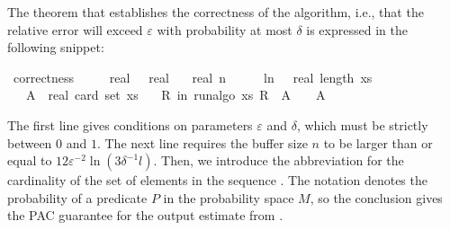
The theorem that establishes the correctness of the algorithm, i.e., that the relative error will exceed $\varepsilon$ with probability at most $\delta$ is expressed in the following snippet:
\begin{isabelle_cm}
\isamarkupfalse%
\ correctness{\isacharcolon}{\kern0pt}\isanewline
\ \ \ {\isacartoucheopen}{\isasymepsilon}\ {\isasymin}\ {\isacharbraceleft}{\kern0pt}{}{\isacharless}{\kern0pt}{\isachardot}{\kern0pt}{\isachardot}{\kern0pt}{\isacharless}{\kern0pt}{}{\isacharcolon}{\kern0pt}{\isacharcolon}{\kern0pt}real{\isacharbraceright}{\kern0pt}{\isacartoucheclose}\ {\isacartoucheopen}{\isasymdelta}\ {\isasymin}\ {\isacharbraceleft}{\kern0pt}{}{\isacharless}{\kern0pt}{\isachardot}{\kern0pt}{\isachardot}{\kern0pt}{\isacharless}{\kern0pt}{}{\isacharcolon}{\kern0pt}{\isacharcolon}{\kern0pt}real{\isacharbraceright}{\kern0pt}{\isacartoucheclose}\isanewline
\ \ \ {\isacartoucheopen}real\ n\ {\isasymge}\ {}{}\ {\isacharslash}{\kern0pt}\ {\isasymepsilon}\ {\isacharasterisk}{\kern0pt}\ ln\ {\isacharparenleft}{\kern0pt}{}\ {\isacharasterisk}{\kern0pt}\ real\ {\isacharparenleft}{\kern0pt}length\ xs{\isacharparenright}{\kern0pt}\ {\isacharslash}{\kern0pt}\ {\isasymdelta}{\isacharparenright}{\kern0pt}{\isacartoucheclose}\isanewline
\ \ \ {\isacartoucheopen}A\ {\isasymequiv}\ real\ {\isacharparenleft}{\kern0pt}card\ {\isacharparenleft}{\kern0pt}set\ xs{\isacharparenright}{\kern0pt}{\isacharparenright}{\kern0pt}{\isacartoucheclose}\isanewline
\ \ \ {\isacartoucheopen}{\isasymP}{\isacharparenleft}{\kern0pt}R\ in\ run{\isacharunderscore}{\kern0pt}algo\ xs{\isachardot}{\kern0pt}\ {\isasymbar}R\ {\isacharminus}{\kern0pt}\ A{\isasymbar}\ {\isachargreater}{\kern0pt}\ {\isasymepsilon}\ {\isacharasterisk}{\kern0pt}\ A{\isacharparenright}{\kern0pt}\ {\isasymle}\ {\isasymdelta}{\isacartoucheclose}
\end{isabelle_cm}
The first line gives conditions on parameters $\varepsilon$ and $\delta$, which must be strictly between $0$ and $1$.
The next line requires the buffer size $n$ to be larger than or equal to $12 \varepsilon^{-2} \ln ( 3 \delta^{-1} l)$.
Then, we introduce the abbreviation  for the cardinality of the set of elements in the sequence .
The notation  denotes the probability of a predicate $P$ in the probability space $M$, so the conclusion gives the PAC guarantee for the output estimate  from .

